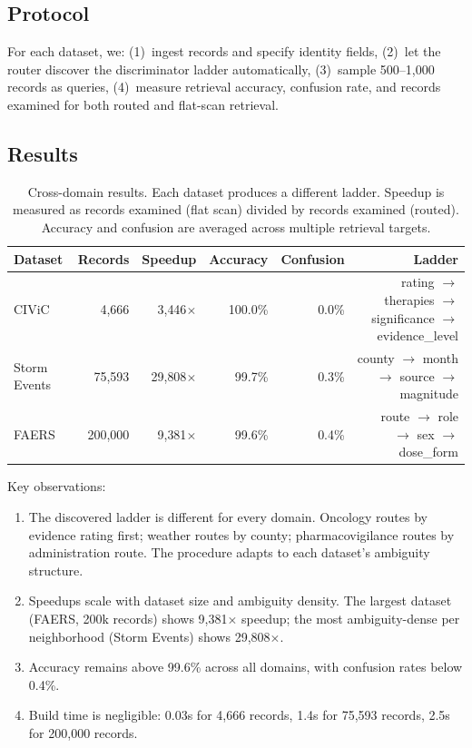 \documentclass[11pt]{article}
\begin{document}
\subsection{Protocol}

For each dataset, we: (1)~ingest records and specify identity fields, (2)~let the router discover the discriminator ladder automatically, (3)~sample 500--1{,}000 records as queries, (4)~measure retrieval accuracy, confusion rate, and records examined for both routed and flat-scan retrieval.

\subsection{Results}

\begin{table}[h]
\centering
\begin{tabular}{lrrrrr}
\toprule
Dataset & Records & Speedup & Accuracy & Confusion & Ladder \\
\midrule
CIViC & 4{,}666 & 3{,}446$\times$ & 100.0\% & 0.0\% & rating $\to$ therapies $\to$ significance $\to$ evidence\_level \\
Storm Events & 75{,}593 & 29{,}808$\times$ & 99.7\% & 0.3\% & county $\to$ month $\to$ source $\to$ magnitude \\
FAERS & 200{,}000 & 9{,}381$\times$ & 99.6\% & 0.4\% & route $\to$ role $\to$ sex $\to$ dose\_form \\
\bottomrule
\end{tabular}
\caption{Cross-domain results. Each dataset produces a different ladder. Speedup is measured as records examined (flat scan) divided by records examined (routed). Accuracy and confusion are averaged across multiple retrieval targets.}
\label{tab:results}
\end{table}

Key observations:

\begin{enumerate}
\item The discovered ladder is different for every domain. Oncology routes by evidence rating first; weather routes by county; pharmacovigilance routes by administration route. The procedure adapts to each dataset's ambiguity structure.
\item Speedups scale with dataset size and ambiguity density. The largest dataset (FAERS, 200k records) shows 9{,}381$\times$ speedup; the most ambiguity-dense per neighborhood (Storm Events) shows 29{,}808$\times$.
\item Accuracy remains above 99.6\% across all domains, with confusion rates below 0.4\%.
\item Build time is negligible: 0.03s for 4{,}666 records, 1.4s for 75{,}593 records, 2.5s for 200{,}000 records.
\end{enumerate}
\end{document}
